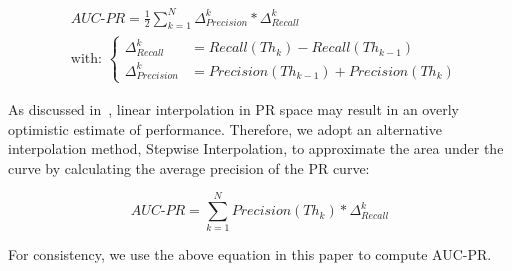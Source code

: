 {\footnotesize
\begin{equation}
\begin{split}
&AUC\text{-}PR = \frac{1}{2}\sum_{k=1}^{N} \Delta^{k}_{Precision}*\Delta^{k}_{Recall}\\
&\text{with: } \left.
\begin{cases}
\Delta^{k}_{Recall} &= Recall(Th_{k})-Recall(Th_{k-1})\\
\Delta^{k}_{Precision} &= Precision(Th_{k-1})+Precision(Th_{k})
\end{cases}
\right. 
\end{split}
\label{equAUCPR}
\end{equation}
}

\noindent As discussed in~\cite{10.1145/1143844.1143874}, linear interpolation in PR space may result in an overly optimistic estimate of performance. Therefore, we adopt an alternative interpolation method, Stepwise Interpolation, to approximate the area under the curve by calculating the average precision of the PR curve:

\begin{equation}
AUC\text{-}PR = \sum_{k=1}^{N} Precision(Th_{k})*\Delta^{k}_{Recall}
\end{equation}

\noindent For consistency, we use the above equation in this paper to compute AUC-PR.